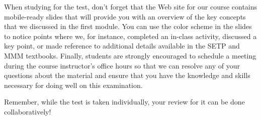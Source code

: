 When studying for the test, don't forget that the Web site for our course contains mobile-ready slides that will provide
you with an overview of the key concepts that we discussed in the first module. You can use the color scheme in the
slides to notice points where we, for instance, completed an in-class activity, discussed a key point, or made reference
to additional details available in the SETP and MMM textbooks. Finally, students are strongly encouraged to schedule a
meeting during the course instructor's office hours so that we can resolve any of your questions about the material and
ensure that you have the knowledge and skills necessary for doing well on this examination. 

Remember, while the test is taken individually, your review for it can be done collaboratively!


